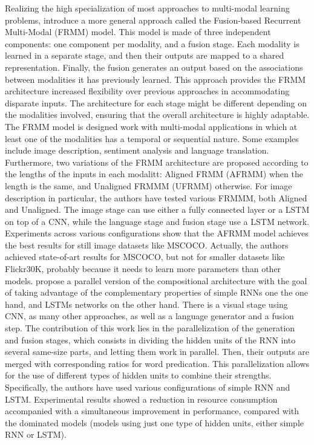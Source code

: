 Realizing the high specialization of most approaches to multi-modal learning problems, \citet{Oruganti2016} introduce a more general approach called the Fusion-based Recurrent Multi-Modal (FRMM) model. This model is made of three independent components: one component per modality, and a fusion stage. Each modality is learned in a separate stage, and then their outputs are mapped to a shared representation. Finally, the fusion generates an output based on the associations between modalities it has previously learned. This approach provides the FRMM architecture increased flexibility over previous approaches in accommodating disparate inputs. The architecture for each stage might be different depending on the modalities involved, ensuring that the overall architecture is highly adaptable. The FRMM model is designed work with multi-modal applications in which at least one of the modalities has a temporal or sequential nature. Some examples include image description, sentiment analysis and language translation. Furthermore, two variations of the FRMM architecture are proposed according to the lengths of the inputs in each modalitt: Aligned FRMM (AFRMM) when the length is the same, and Unaligned FRMMM (UFRMM) otherwise. For image description in particular, the authors have tested various FRMMM, both Aligned and Unaligned. The image stage can use either a fully connected layer or a LSTM on top of a CNN, while the language stage and fusion stage use a LSTM network. Experiments across various configurations show that the AFRMM model achieves the best results for still image datasets like MSCOCO. Actually, the authors achieved state-of-art results for MSCOCO, but not for smaller datasets like Flickr30K, probably because it needs to learn more parameters than other models. 
\citet{Wang2016} propose a parallel version of the compositional architecture with the goal of taking advantage of the complementary properties of simple RNNs one the one hand, and LSTMs networks on the other hand. There is a visual stage using CNN, as many other approaches, as well as a language generator and a fusion step. The contribution of this work lies in the parallelization of the generation and fusion stages, which consists in dividing the hidden units of the RNN into several same-size parts, and letting them work in parallel. Then, their outputs are merged with corresponding ratios for word predication. This parallelization allows for the use of different types of hidden units to combine their strengths. Specifically, the authors have used various configurations of simple RNN and LSTM. Experimental results showed a reduction in resource consumption accompanied with a simultaneous improvement in performance, compared with the dominated models (models using just one type of hidden units, either simple RNN or LSTM).

